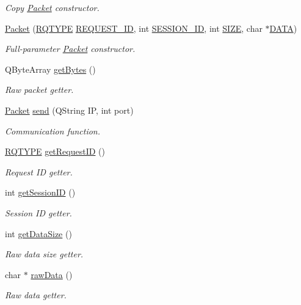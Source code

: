 \begin{DoxyCompactItemize}
\begin{DoxyCompactList}\small\item\em Copy \hyperlink{classPacket}{Packet} constructor. \end{DoxyCompactList}\item 
\hyperlink{classPacket_a3b5e228aeb6b3b4988f69433a9ccfb57}{Packet} (\hyperlink{packet_8h_a15e96d9e79cfa4c3aaba6861be4707e3}{R\-Q\-T\-Y\-P\-E} \hyperlink{classPacket_a1e3e5174c14d3fa58d84e3449fbc8528}{R\-E\-Q\-U\-E\-S\-T\-\_\-\-I\-D}, int \hyperlink{classPacket_ab961c50e0041597c29c52d1e397c5f91}{S\-E\-S\-S\-I\-O\-N\-\_\-\-I\-D}, int \hyperlink{classPacket_a095ff3c0e41af547f0f7cc2464b0cb87}{S\-I\-Z\-E}, char $\ast$\hyperlink{classPacket_abc0a29f961bdd40de882e39601884866}{D\-A\-T\-A})
\begin{DoxyCompactList}\small\item\em Full-\/parameter \hyperlink{classPacket}{Packet} constructor. \end{DoxyCompactList}\item 
Q\-Byte\-Array \hyperlink{classPacket_a0a267f964f5d9bf71159103eda50fbec}{get\-Bytes} ()
\begin{DoxyCompactList}\small\item\em Raw packet getter. \end{DoxyCompactList}\item 
\hyperlink{classPacket}{Packet} \hyperlink{classPacket_aeca5b2428ba736a24fe08c7322b74bb0}{send} (Q\-String I\-P, int port)
\begin{DoxyCompactList}\small\item\em Communication function. \end{DoxyCompactList}\item 
\hyperlink{packet_8h_a15e96d9e79cfa4c3aaba6861be4707e3}{R\-Q\-T\-Y\-P\-E} \hyperlink{classPacket_aa1e7e204d2ba664112050246d11bb86c}{get\-Request\-I\-D} ()
\begin{DoxyCompactList}\small\item\em Request I\-D getter. \end{DoxyCompactList}\item 
int \hyperlink{classPacket_a65b04ece5e53c1de54ee9315b7ff4a07}{get\-Session\-I\-D} ()
\begin{DoxyCompactList}\small\item\em Session I\-D getter. \end{DoxyCompactList}\item 
int \hyperlink{classPacket_abb2c4b6aeb0254214210ae9542574609}{get\-Data\-Size} ()
\begin{DoxyCompactList}\small\item\em Raw data size getter. \end{DoxyCompactList}\item 
char $\ast$ \hyperlink{classPacket_ac4dc8bfb2c1839018b5a2a4ddf815fdb}{raw\-Data} ()
\begin{DoxyCompactList}\small\item\em Raw data getter. \end{DoxyCompactList}\end{DoxyCompactItemize}

